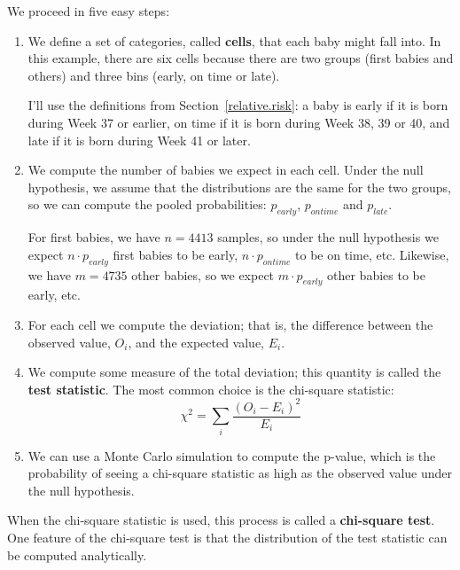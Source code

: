 \documentclass[12pt]{book}
\begin{document}
We proceed in five easy steps:

\begin{enumerate}

\item We define a set of categories, called {\bf cells}, that each
  baby might fall into.  In this example, there are six cells because
  there are two groups (first babies and others) and three bins
  (early, on time or late).


I'll use the definitions from Section~\ref{relative.risk}: a baby is
early if it is born during Week 37 or earlier, on time if it is born
during Week 38, 39 or 40, and late if it is born during Week 41 or
later.

\item We compute the number of babies we expect in each cell.  Under
  the null hypothesis, we assume that the distributions are the same
  for the two groups, so we can compute the pooled probabilities:
  $p_{early}$, $p_{ontime}$ and $p_{late}$.

For first babies, we have $n=4413$ samples, so under the null
hypothesis we expect $n \cdot p_{early}$ first babies to be early, $n
\cdot p_{ontime}$ to be on time, etc.  Likewise, we have $m=4735$
other babies, so we expect $m \cdot p_{early}$ other babies to be
early, etc.

\item For each cell we compute the deviation; that is, the difference
  between the observed value, $O_i$, and the expected value, $E_i$.


\item We compute some measure of the total deviation; this quantity
is called the {\bf test statistic}.  The most common
choice is the chi-square statistic:
%
  \[ \chi^2 = \sum_i \frac{(O_i - E_i)^2}{E_i} \]
%

\item We can use a Monte Carlo simulation to compute the p-value,
  which is the probability of seeing a chi-square statistic as high
  as the observed value under the null hypothesis.


\end{enumerate}

When the chi-square statistic is used, this process is called a 
{\bf chi-square test}.  One feature of the chi-square test is that
the distribution of the test statistic can be computed analytically.
\end{document}
